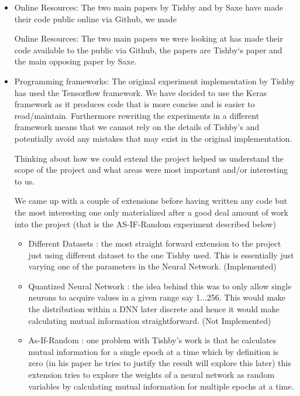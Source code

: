 \begin{itemize}
  \item{
      Online Resources: The two main papers by Tishby and by Saxe have made
      their code public online via Github, we made 

      Online Resources: The two main papers we were looking at has made their
      code available to the public via Github, the papers are Tishby`s paper and
      the main opposing paper by Saxe.
    }
  \item{
      Programming frameworks: The original experiment implementation by Tishby
      has used the Tensorflow framework. We have decided to use the Keras
      framework as it produces code that is more concise and is easier to
      read/maintain. Furthermore rewriting the experiments in a different
      framework means that we cannot rely on the details of Tishby's and
      potentially avoid any mistakes that may exist in the original
      implementation.
    }
    \begin{item}

      Thinking about how we could extend the project helped us understand the
      scope of the project and what areas were most important and/or interesting
      to us. 

      We came up with a couple of extensions before having written any code but
      the most interesting one only materialized after a good deal amount of
      work into the project (that is the AS-IF-Random experiment described
      below)

      \begin{itemize}
        \item{
            Different Datasets : the most straight forward extension to the
            project just using different dataset to the one Tishby used. This is
            essentially just varying one of the parameters in the Neural
            Network. (Implemented)
          }
        \item{
            Quantized Neural Network : the idea behind this was to only allow
            single neurons to acquire values in a given range say 1...256. This
            would make the distribution within a DNN later discrete and hence it
            would make calculating mutual information straightforward. (Not
            Implemented)
          }
        \item{
            As-If-Random : one problem with Tishby's work is that he calculates
            mutual information for a single epoch at a time which by definition
            is zero (in his paper he tries to justify the result will explore
            this later) this extension tries to explore the weights of a neural
            network as random variables by calculating mutual information for
            multiple epochs at a time.
          }
      \end{itemize}
    \end{item}
\end{itemize}
